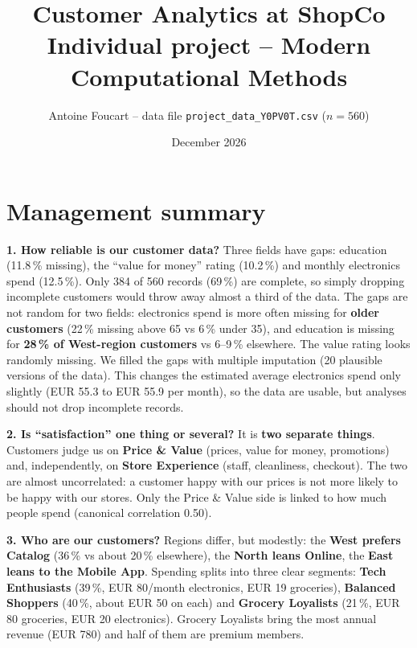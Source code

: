 \documentclass[10pt,a4paper]{article}
\title{Customer Analytics at ShopCo\\[2pt]
       \large Individual project -- Modern Computational Methods}
\author{Antoine Foucart -- data file \texttt{project\_data\_Y0PV0T.csv} ($n = 560$)}
\date{December 2026}
\begin{document}
\maketitle

\section{Management summary}

\textbf{1. How reliable is our customer data?} Three fields have gaps: education (11.8\,\% missing), the ``value for money'' rating (10.2\,\%) and monthly electronics spend (12.5\,\%). Only 384 of 560 records (69\,\%) are complete, so simply dropping incomplete customers would throw away almost a third of the data. The gaps are not random for two fields: electronics spend is more often missing for \textbf{older customers} (22\,\% missing above 65 vs 6\,\% under 35), and education is missing for \textbf{28\,\% of West-region customers} vs 6--9\,\% elsewhere. The value rating looks randomly missing. We filled the gaps with multiple imputation (20 plausible versions of the data). This changes the estimated average electronics spend only slightly (EUR 55.3 to EUR 55.9 per month), so the data are usable, but analyses should not drop incomplete records.

\textbf{2. Is ``satisfaction'' one thing or several?} It is \textbf{two separate things}. Customers judge us on \textbf{Price \& Value} (prices, value for money, promotions) and, independently, on \textbf{Store Experience} (staff, cleanliness, checkout). The two are almost uncorrelated: a customer happy with our prices is not more likely to be happy with our stores. Only the Price \& Value side is linked to how much people spend (canonical correlation 0.50).

\textbf{3. Who are our customers?} Regions differ, but modestly: the \textbf{West prefers Catalog} (36\,\% vs about 20\,\% elsewhere), the \textbf{North leans Online}, the \textbf{East leans to the Mobile App}. Spending splits into three clear segments: \textbf{Tech Enthusiasts} (39\,\%, EUR 80/month electronics, EUR 19 groceries), \textbf{Balanced Shoppers} (40\,\%, about EUR 50 on each) and \textbf{Grocery Loyalists} (21\,\%, EUR 80 groceries, EUR 20 electronics). Grocery Loyalists bring the most annual revenue (EUR 780) and half of them are premium members.
\end{document}
